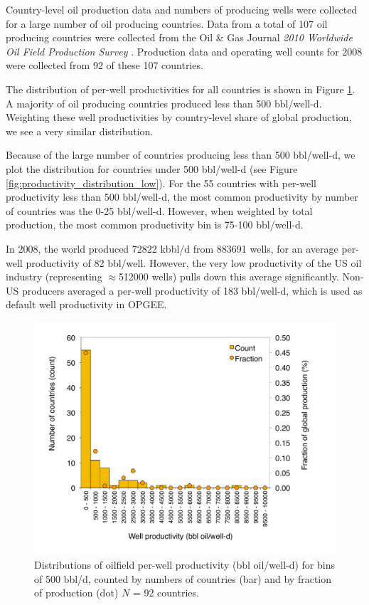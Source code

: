 \documentclass[11pt]{report}
\newcommand{\marg}[1]{{\footnotesize\textit{\textcolor{stanford}{'#1'}}}}
\newcommand{\marginnote}[1]{\marginpar{\marg{#1}}}
\begin{document}
Country-level oil production data and numbers of producing wells were collected for a large number of oil producing countries. Data from a total of 107 oil producing countries were collected from the Oil \& Gas Journal \emph{2010 Worldwide Oil Field Production Survey} \cite{OGJ2009b}. Production data and operating well counts for 2008 were collected from 92 of these 107 countries. 

The distribution of per-well productivities for all countries is shown in Figure \ref{fig:productivity_distribution_all}. A majority of oil producing countries produced less than 500 bbl/well-d. Weighting these well productivities by country-level share of global production, we see a very similar distribution.

Because of the large number of countries producing less than 500 bbl/well-d, we plot the distribution for countries under 500 bbl/well-d (see Figure \ref{fig:productivity_distribution_low}). For the 55 countries with per-well productivity less than 500 bbl/well-d, the most common productivity by number of countries was the 0-25 bbl/well-d. However, when weighted by total production, the most common productivity bin is 75-100 bbl/well-d. 

In 2008, the world produced 72822 kbbl/d from 883691 wells, for an average per-well productivity of 82 bbl/well. \marginnote{Active Field 2.2.6} However, the very low productivity of the US oil industry (representing $\approx$512000 wells) pulls down this average significantly. Non-US producers averaged a per-well productivity of 183 bbl/well-d, which is used as default well productivity in OPGEE.

\begin{figure}[t]
\includegraphics[width=0.8\columnwidth]{images/well_prod_all.pdf}
\caption{Distributions of oilfield per-well productivity (bbl oil/well-d) for bins of 500 bbl/d, counted by numbers of countries (bar) and by fraction of production (dot) $N$ = 92 countries.}
\label{fig:productivity_distribution_all}
\end{figure}
\end{document}
